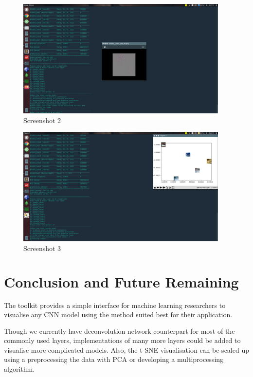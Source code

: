 \documentclass{article} %
\begin{document}
\begin{figure}[h]
  \begin{center}
  \includegraphics[width=400]{ss2.png}
  \end{center}
  \caption{Screenshot 2}
\end{figure}

\begin{figure}[h]
  \begin{center}
  \includegraphics[width=400]{ss3.png}
  \end{center}
  \caption{Screenshot 3}
\end{figure}

\section{Conclusion and Future Remaining}
The toolkit provides a simple interface for machine learning researchers
to visualise any CNN model using the method suited best for their application.

Though we currently have deconvolution network counterpart for most of the
commonly used layers, implementations of many more layers could be added to
visualise more complicated models. Also, the t-SNE visualisation can be scaled up
using a preprocessing the data with PCA or developing a multiprocessing algorithm.
\end{document}
